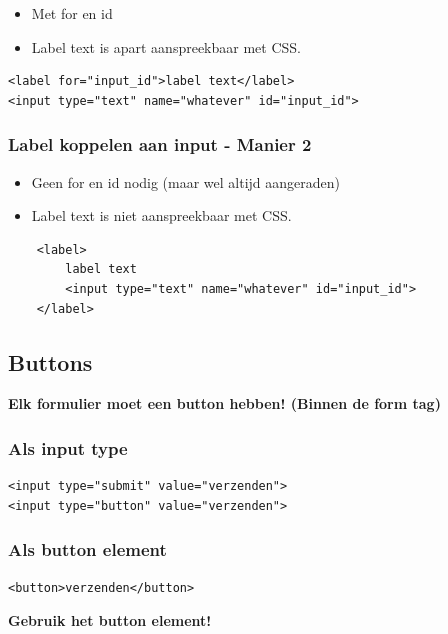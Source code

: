 \documentclass{article}
\newcommand{\bold}[1]{\textbf{#1}}
\begin{document}
\begin{itemize}
    \item Met for en id
    \item Label text is apart aanspreekbaar met CSS.
\end{itemize}

\begin{verbatim}
<label for="input_id">label text</label>
<input type="text" name="whatever" id="input_id">
\end{verbatim}



\subsubsection{Label koppelen aan input - Manier 2}
\begin{itemize}
    \item Geen for en id nodig (maar wel altijd aangeraden)
    \item Label text is niet aanspreekbaar met CSS.
\end{itemize}

\begin{verbatim}
    <label>
        label text
        <input type="text" name="whatever" id="input_id">
    </label>
    \end{verbatim}


\subsection{Buttons}
\bold{Elk formulier moet een button hebben! (Binnen de form tag)}

\subsubsection{Als input type}

\begin{verbatim}
<input type="submit" value="verzenden">
<input type="button" value="verzenden">
\end{verbatim}

\subsubsection{Als button element}

\begin{verbatim}
<button>verzenden</button>
\end{verbatim}

\bold{Gebruik het button element!}
\end{document}

